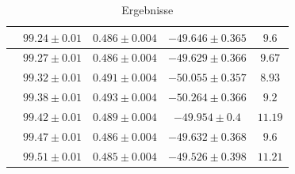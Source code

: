 \documentclass[12pt,a4paper]{article}
\begin{document}
\begin{table}
\centering
\begin{tabular}{|c|c|c|c|c|}
\hline
& $ 99.24 \pm 0.01 $ & $ 0.486 \pm 0.004 $ & $ -49.646 \pm 0.365 $ & $ 9.6 $\\
\hline
& $ 99.27 \pm 0.01 $ & $ 0.486 \pm 0.004 $ & $ -49.629 \pm 0.366 $ & $ 9.67 $\\
\hline
& $ 99.32 \pm 0.01 $ & $ 0.491 \pm 0.004 $ & $ -50.055 \pm 0.357 $ & $ 8.93 $\\
\hline
\hline
& $ 99.38 \pm 0.01 $ & $ 0.493 \pm 0.004 $ & $ -50.264 \pm 0.366 $ & $ 9.2 $\\
\hline
\hline
& $ 99.42 \pm 0.01 $ & $ 0.489 \pm 0.004 $ & $ -49.954 \pm 0.4 $ & $ 11.19 $\\
\hline
& $ 99.47 \pm 0.01 $ & $ 0.486 \pm 0.004 $ & $ -49.632 \pm 0.368 $ & $ 9.6 $\\
\hline
& $ 99.51 \pm 0.01 $ & $ 0.485 \pm 0.004 $ & $ -49.526 \pm 0.398 $ & $ 11.21 $\\
\hline
\end{tabular} 
\caption{Ergebnisse }
\label{tab:X1_anpassungen}
\end{table}
\end{document}
